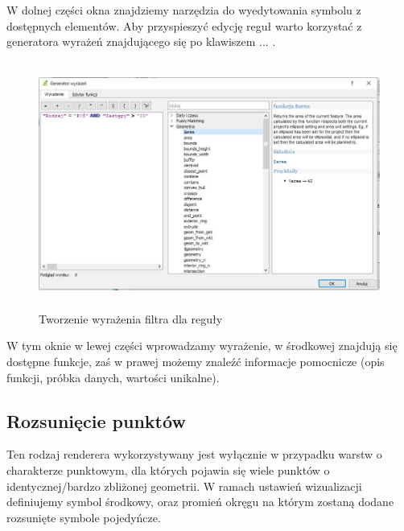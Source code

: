 \documentclass[12pt,a4paper]{book}
\begin{document}
W dolnej części okna znajdziemy narzędzia do wyedytowania symbolu z dostępnych elementów. Aby przyspieszyć edycję reguł warto korzystać z generatora wyrażeń znajdującego się po klawiszem  ... .

\begin{figure}
\includegraphics[width=13cm,height=8.107cm]{007-filtr-reguly.jpg}
\caption{Tworzenie wyrażenia filtra dla reguły}
\end{figure}
W tym oknie w lewej części wprowadzamy wyrażenie, w środkowej znajdują się dostępne funkcje, zaś w prawej możemy znaleźć informacje pomocnicze (opis funkcji, próbka danych, wartości unikalne).

\subsection{Rozsunięcie punktów}
Ten rodzaj renderera wykorzystywany jest wyłącznie w przypadku warstw o charakterze punktowym, dla których pojawia się wiele punktów o identycznej/bardzo zbliżonej geometrii. W ramach ustawień wizualizacji definiujemy symbol środkowy, oraz promień okręgu na którym zostaną dodane rozsunięte symbole pojedyńcze.
\end{document}
